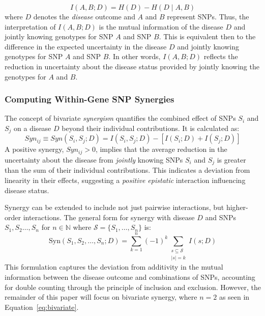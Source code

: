 \documentclass{article}\usepackage[]{graphicx}\usepackage[]{color}
\begin{document}
\begin{equation}
I(A,B;D) = H(D) - H(D \mid A,B)
\label{eq:bi_inf}
\end{equation}
where $D$ denotes the \textit{disease} outcome and $A$ and $B$ represent SNPs. Thus, the interpretation of $I(A,B;D)$ is the mutual information of the disease $D$ and jointly knowing genotypes for SNP $A$ and SNP $B$. This is equivalent then to the difference in the expected uncertainty in the disease $D$ and jointly knowing genotypes for SNP $A$ and SNP $B$. In other words, $I(A,B;D)$ reflects the reduction in uncertainty about the disease status provided by jointly knowing the genotypes for $A$ and $B$\cite{walakiraDetectingGeneGene2022}.

\subsubsection{Computing Within-Gene SNP Synergies}
\label{sec:withingene}
The concept of bivariate \textit{synergism} quantifies the combined effect of SNPs $S_i$ and $S_j$ on a disease $D$ beyond their individual contributions. It is calculated as:
\begin{equation}
Syn_{ij} \equiv Syn(S_i, S_j; D) = I(S_i,  S_j; D) -[I(S_i; D) + I(S_j; D)]
\label{eq:bivariate}
\end{equation}
A positive synergy, $Syn_{ij}>0$, implies that the average reduction in the uncertainty about the disease from \textit{jointly} knowing SNPs $S_i$ and $S_j$ is greater than the sum of their individual contributions. This indicates a deviation from linearity in their effects, suggesting a \textit{positive epistatic} interaction influencing disease status.
\par
Synergy can be extended to include not just pairwise interactions, but higher-order interactions. The general form for synergy with disease $D$ and SNPs $S_1, S_2 \ldots, S_n$ for $n\in \mathbb{N}$ where $\mathcal{S} = \{S_1, \ldots, S_n\}$ is:
\begin{equation}
\text{Syn}(S_1, S_2, \ldots, S_n; D) = \sum_{k=1}^{n} (-1)^{k} \sum_{\substack{s \subseteq \mathcal{S} \\ |s| = k}} I(s; D)
\label{eq:gen_syn}
\end{equation}
This formulation captures the deviation from additivity in the mutual information between the disease outcome and combinations of SNPs, accounting for double counting through the principle of inclusion and exclusion. However, the remainder of this paper will focus on bivariate synergy, where $n=2$ as seen in Equation~\ref{eq:bivariate}. 
\end{document}
